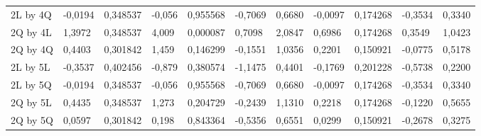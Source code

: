 \begin{table}[H]
{\begin{tabular}{lllllllllll}
\rowcolor[HTML]{FFFFFF} 
2L by 4Q       & -0,0194                         & 0,348537                        & -0,056                          & 0,955568                        & -0,7069                         & 0,6680                          & -0,0097                         & 0,174268                        & -0,3534                         & 0,3340                          \\
\rowcolor[HTML]{FFFFFF} 
2Q by 4L       & {\color[HTML]{FF0000} 1,3972}   & {\color[HTML]{FF0000} 0,348537} & {\color[HTML]{FF0000} 4,009}    & {\color[HTML]{FF0000} 0,000087} & {\color[HTML]{FF0000} 0,7098}   & {\color[HTML]{FF0000} 2,0847}   & {\color[HTML]{FF0000} 0,6986}   & {\color[HTML]{FF0000} 0,174268} & {\color[HTML]{FF0000} 0,3549}   & {\color[HTML]{FF0000} 1,0423}   \\
\rowcolor[HTML]{FFFFFF} 
2Q by 4Q       & 0,4403                          & 0,301842                        & 1,459                           & 0,146299                        & -0,1551                         & 1,0356                          & 0,2201                          & 0,150921                        & -0,0775                         & 0,5178                          \\
\rowcolor[HTML]{FFFFFF} 
2L by 5L       & -0,3537                         & 0,402456                        & -0,879                          & 0,380574                        & -1,1475                         & 0,4401                          & -0,1769                         & 0,201228                        & -0,5738                         & 0,2200                          \\
\rowcolor[HTML]{FFFFFF} 
2L by 5Q       & -0,0194                         & 0,348537                        & -0,056                          & 0,955568                        & -0,7069                         & 0,6680                          & -0,0097                         & 0,174268                        & -0,3534                         & 0,3340                          \\
\rowcolor[HTML]{FFFFFF} 
2Q by 5L       & 0,4435                          & 0,348537                        & 1,273                           & 0,204729                        & -0,2439                         & 1,1310                          & 0,2218                          & 0,174268                        & -0,1220                         & 0,5655                          \\
\rowcolor[HTML]{FFFFFF} 
2Q by 5Q       & 0,0597                          & 0,301842                        & 0,198                           & 0,843364                        & -0,5356                         & 0,6551                          & 0,0299                          & 0,150921                        & -0,2678                         & 0,3275                          \\

\end{tabular}}
\end{table}
